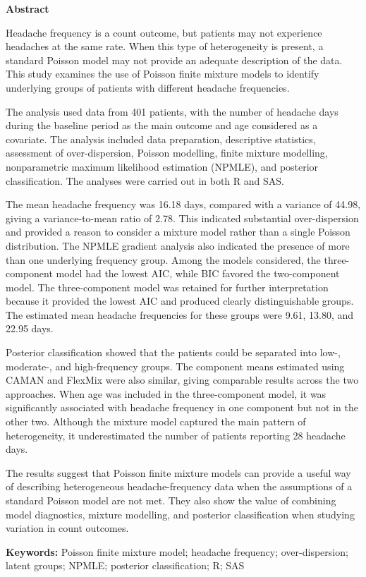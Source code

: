 \begin{center}
{\Large\bfseries Abstract}
\end{center}

Headache frequency is a count outcome, but patients may not experience headaches at the same rate. When this type of heterogeneity is present, a standard Poisson model may not provide an adequate description of the data. This study examines the use of Poisson finite mixture models to identify underlying groups of patients with different headache frequencies.

The analysis used data from 401 patients, with the number of headache days during the baseline period as the main outcome and age considered as a covariate. The analysis included data preparation, descriptive statistics, assessment of over-dispersion, Poisson modelling, finite mixture modelling, nonparametric maximum likelihood estimation (NPMLE), and posterior classification. The analyses were carried out in both R and SAS.

The mean headache frequency was 16.18 days, compared with a variance of 44.98, giving a variance-to-mean ratio of 2.78. This indicated substantial over-dispersion and provided a reason to consider a mixture model rather than a single Poisson distribution. The NPMLE gradient analysis also indicated the presence of more than one underlying frequency group. Among the models considered, the three-component model had the lowest AIC, while BIC favored the two-component model. The three-component model was retained for further interpretation because it provided the lowest AIC and produced clearly distinguishable groups. The estimated mean headache frequencies for these groups were 9.61, 13.80, and 22.95 days.

Posterior classification showed that the patients could be separated into low-, moderate-, and high-frequency groups. The component means estimated using CAMAN and FlexMix were also similar, giving comparable results across the two approaches. When age was included in the three-component model, it was significantly associated with headache frequency in one component but not in the other two. Although the mixture model captured the main pattern of heterogeneity, it underestimated the number of patients reporting 28 headache days.

The results suggest that Poisson finite mixture models can provide a useful way of describing heterogeneous headache-frequency data when the assumptions of a standard Poisson model are not met. They also show the value of combining model diagnostics, mixture modelling, and posterior classification when studying variation in count outcomes.

\bigskip
\noindent\textbf{Keywords:} Poisson finite mixture model; headache frequency; over-dispersion; latent groups; NPMLE; posterior classification; R; SAS
